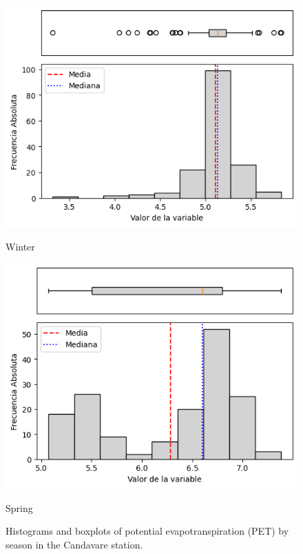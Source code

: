 \begin{figure}[H]
\begin{minipage}{0.30\textwidth}
  \includegraphics[width=\linewidth]{resultados/por_estacion_del_anio/boxplot_clases_por_estacion/Candavare/PET_HistBoxplot_Winter.png}
  \caption*{Winter}
\end{minipage}
\hfill
\begin{minipage}{0.30\textwidth}
  \includegraphics[width=\linewidth]{resultados/por_estacion_del_anio/boxplot_clases_por_estacion/Candavare/PET_HistBoxplot_Spring.png}
  \caption*{Spring}
\end{minipage}
\caption{Histograms and boxplots of potential evapotranspiration (PET) by season in the Candavare station.}
\label{fig:candavare_pet_hist}
\end{figure}

